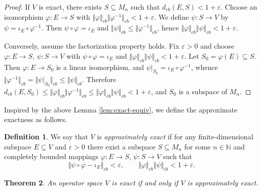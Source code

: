 \documentclass[12pt]{article}
\newtheorem{theorem}{Theorem}[section]
\theoremstyle{definition}
\newtheorem{definition}[theorem]{Definition}
\theoremstyle{remark}
\begin{document}
\begin{proof}
If $V$ is exact, there exists $S\subseteq M_n$ such that $d_{cb}(E,S)<1+\varepsilon$. Choose an isomorphism
$\varphi:E\to S$ with
$\Vert\varphi\Vert_{cb}\Vert\varphi^{-1}\Vert_{cb}<1+\varepsilon$.
We define $\psi:S\to V$ by $\psi=\iota_E\circ\varphi^{-1}$. Then
$\psi\circ\varphi=\iota_E$ and
$\Vert\psi\Vert_{cb}\le\Vert\varphi^{-1}\Vert_{cb}$, hence
$\Vert\varphi\Vert_{cb}\Vert\psi\Vert_{cb}<1+\varepsilon$.

Conversely, assume the factorization property holds. Fix $\varepsilon>0$ and choose
$\varphi:E\to S$, $\psi:S\to V$ with $\psi\circ\varphi=\iota_E$ and
$\Vert\varphi\Vert_{cb}\Vert\psi\Vert_{cb}<1+\varepsilon$. Let
$S_0=\varphi(E)\subseteq S$. Then $\varphi:E\to S_0$ is a linear isomorphism, and
$\psi|_{S_0}=\iota_E\circ\varphi^{-1}$, whence
$\Vert\varphi^{-1}\Vert_{cb}=\Vert\psi|_{S_0}\Vert_{cb}
\le\Vert\psi\Vert_{cb}$. Therefore
$d_{cb}(E,S_0)\le\Vert\varphi\Vert_{cb}\Vert\varphi^{-1}\Vert_{cb}
\le\Vert\varphi\Vert_{cb}\Vert\psi\Vert_{cb}<1+\varepsilon$, and $S_0$
is a subspace of $M_n$.
\end{proof}

Inspired by the above Lemma \ref{lem:exact-equiv}, we define the approximate exactness as follows.

\begin{definition}\label{def:approx-exact}
We say that $V$ is \emph{approximately exact} if for any
finite-dimensional subspace $E\subseteq V$ and $\varepsilon>0$
there exist a subspace $S\subseteq M_n$ for some $n\in\mathbb{N}$ and completely bounded
mappings $\varphi:E\to S$, $\psi:S\to V$ such that
$$
\Vert\psi\circ\varphi-\iota_E\Vert_{cb}<\varepsilon,
\qquad
\Vert\varphi\Vert_{cb}\Vert\psi\Vert_{cb}<1+\varepsilon.
$$
\end{definition}



\begin{theorem}\label{thm:approx-exact}
An operator space $V$ is exact if and only if $V$ is approximately
exact.
\end{theorem}
\end{document}
